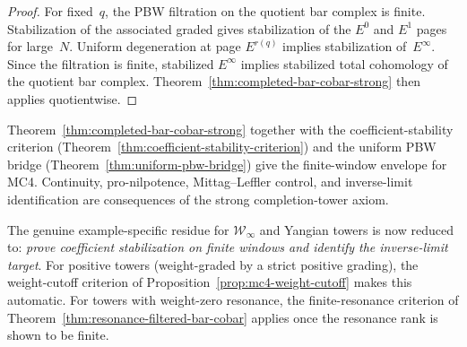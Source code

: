\begin{proof}
For fixed~$q$, the PBW filtration on the quotient bar complex is finite.
Stabilization of the associated graded gives stabilization of the $E^0$
and $E^1$ pages for large~$N$. Uniform degeneration at page $E^{r(q)}$
implies stabilization of~$E^\infty$. Since the filtration is finite,
stabilized $E^\infty$ implies stabilized total cohomology of the quotient
bar complex. Theorem~\ref{thm:completed-bar-cobar-strong} then applies
quotientwise.
\end{proof}

\begin{remark}
\label{rem:completion-closure-envelope}
Theorem~\ref{thm:completed-bar-cobar-strong} together with the
coefficient-stability criterion
(Theorem~\ref{thm:coefficient-stability-criterion}) and the uniform PBW
bridge (Theorem~\ref{thm:uniform-pbw-bridge}) give the finite-window
envelope for MC4. Continuity, pro-nilpotence, Mittag--Leffler control,
and inverse-limit identification are consequences of the strong
completion-tower axiom.

The genuine example-specific residue for $\mathcal{W}_\infty$ and
Yangian towers is now reduced to: \emph{prove coefficient stabilization
on finite windows and identify the inverse-limit target}. For positive
towers (weight-graded by a strict positive grading), the
weight-cutoff criterion of Proposition~\ref{prop:mc4-weight-cutoff} makes
this automatic. For towers with weight-zero resonance, the
finite-resonance criterion of
Theorem~\ref{thm:resonance-filtered-bar-cobar} applies once the
resonance rank is shown to be finite.
\end{remark}


